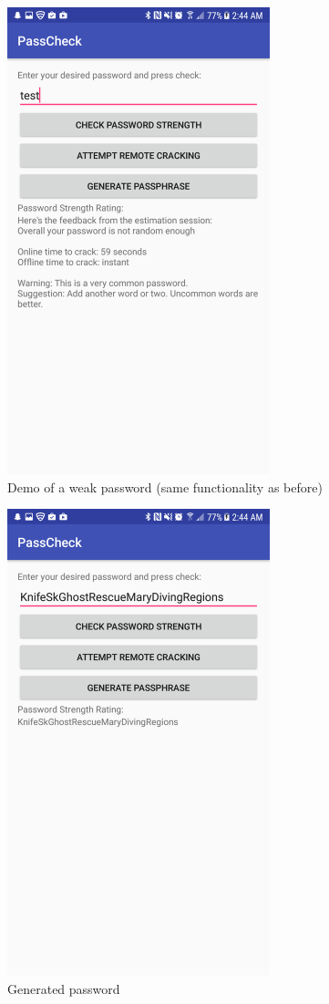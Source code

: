 \documentclass{article}
\begin{document}
\begin{figure}[ht]
      \includegraphics[width=3in]{img/t5s2.png}
      \centering
	\caption{Demo of a weak password (same functionality as before)}
\end{figure}
\begin{figure}[ht]
      \includegraphics[width=3in]{img/t5s3.png}
      \centering
      \caption{Generated password}
\end{figure}
\end{document}
